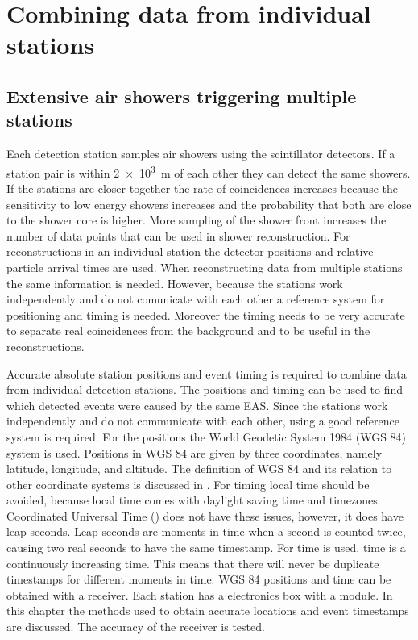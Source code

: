 \chapter{Combining data from individual stations}
\label{ch:cluster}


\section{Extensive air showers triggering multiple stations}

Each detection station samples air showers using the scintillator detectors. If a station pair is within \SI{2e3}{\meter} of each other they can detect the same showers. If the stations are closer together the rate of coincidences increases because the sensitivity to low energy showers increases and the probability that both are close to the shower core is higher. More sampling of the shower front increases the number of data points that can be used in shower reconstruction. For reconstructions in an individual station the detector positions and relative particle arrival times are used. When reconstructing data from multiple stations the same information is needed. However, because the stations work independently and do not comunicate with each other a reference system for positioning and timing is needed. Moreover the timing needs to be very accurate to separate real coincidences from the background and to be useful in the reconstructions.

Accurate absolute station positions and event timing is required to combine data from individual detection stations. The positions and timing can be used to find which detected events were caused by the same EAS. Since the stations work independently and do not communicate with each other, using a good reference system is required. For the positions the World Geodetic System 1984 (WGS 84) system is used. Positions in WGS 84 are given by three coordinates, namely latitude, longitude, and altitude. The definition of WGS 84 and its relation to other coordinate systems is discussed in \cite{hisparc2016coordinates}. For timing local time should be avoided, because local time comes with daylight saving time and timezones. Coordinated Universal Time (\utc) does not have these issues, however, it does have leap seconds. Leap seconds are moments in time when a second is counted twice, causing two real seconds to have the same timestamp. For \hisparc \gps time is used. \gps time is a continuously increasing time. This means that there will never be duplicate timestamps for different moments in time. WGS 84 positions and \gps time can be obtained with a \gps receiver. Each station has a \hisparc electronics box with a \gps module. In this chapter the methods used to obtain accurate \gps locations and event timestamps are discussed. The accuracy of the \gps receiver is tested.


